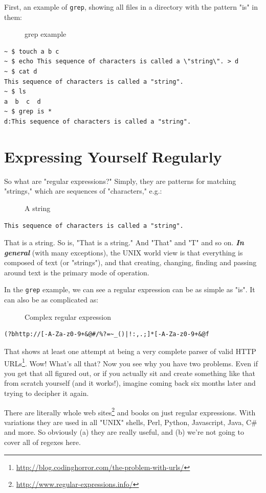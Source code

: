 \documentclass[10pt,]{book}
\renewcommand{\href}[2]{#2\footnote{\url{#1}}}
\numberwithin{figure}{chapter}
\DeclareRobustCommand{\drcap}[1]{\begin{figure}[H]\caption{#1}\end{figure}}
\begin{document}
First, an example of \texttt{grep}, showing all files in a directory
with the pattern "is" in them:

\drcap{grep example}

\begin{verbatim}
~ $ touch a b c
~ $ echo This sequence of characters is called a \"string\". > d
~ $ cat d
This sequence of characters is called a "string".
~ $ ls
a  b  c  d
~ $ grep is *
d:This sequence of characters is called a "string".
\end{verbatim}

\section*{Expressing Yourself
Regularly}\label{expressing-yourself-regularly}

So what are "regular expressions?" Simply, they are patterns for
matching "strings," which are sequences of "characters," e.g.:

\drcap{A string}

\begin{verbatim}
This sequence of characters is called a "string".
\end{verbatim}

That is a string. So is, "That is a string." And "That" and "T" and so
on. \textbf{\emph{In general}} (with many exceptions), the UNIX world
view is that everything is composed of text (or "strings"), and that
creating, changing, finding and passing around text is the primary mode
of operation.

In the \texttt{grep} example, we can see a regular expression can be as
simple as "is". It can also be as complicated as:

\drcap{Complex regular expression}

\begin{verbatim}
(?bhttp://[-A-Za-z0-9+&@#/%?=~_()|!:,.;]*[-A-Za-z0-9+&@f
\end{verbatim}

That shows at least one attempt at being
\href{http://blog.codinghorror.com/the-problem-with-urls/}{a very
complete parser of valid HTTP URLs}. Wow! What's all that? Now you see
why you have two problems. Even if you get that all figured out, or if
you actually sit and create something like that from scratch yourself
(and it works!), imagine coming back six months later and trying to
decipher it again.

There are literally \href{http://www.regular-expressions.info/}{whole
web sites} and books on just regular expressions. With variations they
are used in all "UNIX" shells, Perl, Python, Javascript, Java, C\# and
more. So obviously (a) they are really useful, and (b) we're not going
to cover all of regexes here.
\end{document}
